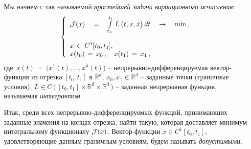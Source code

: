 \documentclass[12pt,a4paper]{article}
\newcommand{\re}{{\mathbb R}}
\newcommand{\cJ}{{\cal{J}}}
\begin{document}
Мы начнем с так называемой {\em простейшей задачи вариационного исчисления}:
\begin{equation}\label{simpl-prob}
\left\{
\begin{array}{l}
\cJ(x)\quad = \quad \int\limits_{t_0}^{t_1}\, L\, \bigl(t, x, \dot
x
\bigr)\, d t\quad \to \quad \min\, ,\\
{}\\
 x \, \in \, C^1 [t_0, t_1] , \\
x(t_0)\, = \, x_0\, , \quad x(t_1)\, = \, x_1\, ,
\end{array}
\right.
\end{equation}
где $\, x(t) \, = \, \bigl(x^1(t), \ldots , x^d(t) \bigr)$ --
непрерывно-дифференцируемая вектор-функция из отрезка $[t_0, t_1]$
в $\re^d$, $x_0, x_1 \in \re^d$ -- заданные  точки  (граничные
условия), $L\in C\, \bigl( \, [t_0, t_1]\times \re^d \times
\re^d\, \bigr)$ -- заданная непрерывная функция, называемая {\em интегрантом}.

Итак,
среди всех   непрерывно-дифференцируемых  функций, принимающих
заданные значения на концах отрезка, найти такую, которая доставляет
минимум интегральному  функционалу $\cJ(x)$. Вектор-функции $x \in C^1[t_0, t_1]$, удовлетворяющие
данным граничным условиям, будем называть {\em допустимыми}.
\end{document}
